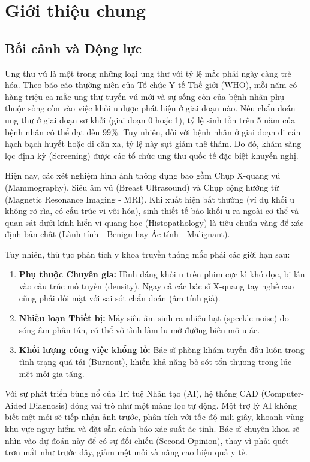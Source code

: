 \documentclass[conference,a4paper]{IEEEtran}
\begin{document}
\section{Giới thiệu chung}
\subsection{Bối cảnh và Động lực}
Ung thư vú là một trong những loại ung thư với tỷ lệ mắc phải ngày càng trẻ hóa. Theo báo cáo thường niên của Tổ chức Y tế Thế giới (WHO), mỗi năm có hàng triệu ca mắc ung thư tuyến vú mới và sự sống còn của bệnh nhân phụ thuộc sống còn vào việc khối u được phát hiện ở giai đoạn nào. Nếu chẩn đoán ung thư ở giai đoạn sơ khởi (giai đoạn 0 hoặc 1), tỷ lệ sinh tồn trên 5 năm của bệnh nhân có thể đạt đến 99\%. Tuy nhiên, đối với bệnh nhân ở giai đoạn di căn hạch bạch huyết hoặc di căn xa, tỷ lệ này sụt giảm thê thảm. Do đó, khám sàng lọc định kỳ (Screening) được các tổ chức ung thư quốc tế đặc biệt khuyến nghị.

Hiện nay, các xét nghiệm hình ảnh thông dụng bao gồm Chụp X-quang vú (Mammography), Siêu âm vú (Breast Ultrasound) và Chụp cộng hưởng từ (Magnetic Resonance Imaging - MRI). Khi xuất hiện bất thường (ví dụ khối u không rõ rìa, có cấu trúc vi vôi hóa), sinh thiết tế bào khối u ra ngoài cơ thể và quan sát dưới kính hiển vi quang học (Histopathology) là tiêu chuẩn vàng để xác định bản chất (Lành tính - Benign hay Ác tính - Malignant).

Tuy nhiên, thủ tục phân tích y khoa truyền thống mắc phải các giới hạn sau:
\begin{enumerate}
\item \textbf{Phụ thuộc Chuyên gia:} Hình dáng khối u trên phim cực kì khó đọc, bị lẫn vào cấu trúc mô tuyến (density). Ngay cả các bác sĩ X-quang tay nghề cao cũng phải đối mặt với sai sót chẩn đoán (âm tính giả).
\item \textbf{Nhiễu loạn Thiết bị:} Máy siêu âm sinh ra nhiễu hạt (speckle noise) do sóng âm phân tán, có thể vô tình làm lu mờ đường biên mô u ác.
\item \textbf{Khối lượng công việc khổng lồ:} Bác sĩ phòng khám tuyến đầu luôn trong tình trạng quá tải (Burnout), khiến khả năng bỏ sót tổn thương trong lúc mệt mỏi gia tăng.
\end{enumerate}

Với sự phát triển bùng nổ của Trí tuệ Nhân tạo (AI), hệ thống CAD (Computer-Aided Diagnosis) đóng vai trò như một màng lọc tự động. Một trợ lý AI không biết mệt mỏi sẽ tiếp nhận ảnh trước, phân tích với tốc độ mili-giây, khoanh vùng khu vực nguy hiểm và đặt sẵn cảnh báo xác suất ác tính. Bác sĩ chuyên khoa sẽ nhìn vào dự đoán này để có sự đối chiếu (Second Opinion), thay vì phải quét trơn mắt như trước đây, giảm mệt mỏi và nâng cao hiệu quả y tế.
\end{document}
